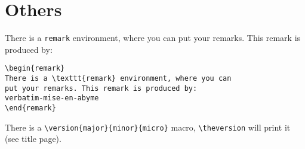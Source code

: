 \documentclass{documentation}
\begin{document}
\section{Others}

\begin{remark}
There is a \texttt{remark} environment, where you can
put your remarks. This remark is produced by:
\begin{verbatim}
\begin{remark}
There is a \texttt{remark} environment, where you can
put your remarks. This remark is produced by:
verbatim-mise-en-abyme
\end{remark}
\end{verbatim}
\end{remark}


There is a \verb!\version{major}{minor}{micro}! macro,
\verb!\theversion! will print it (see title page).
\end{document}
